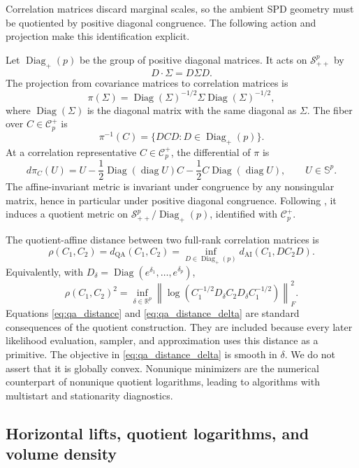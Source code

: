\documentclass[
  12pt]{article}
\newcommand{\SPD}{\mathcal S_{++}}
\newcommand{\Sym}{\mathbb S}
\newcommand{\Corr}{\mathcal C^+}
\newcommand{\Diagp}{\operatorname{Diag}_{+}}
\newcommand{\diag}{\operatorname{diag}}
\newcommand{\Diag}{\operatorname{Diag}}
\newcommand{\R}{\mathbb R}
\newcommand{\QA}{\mathrm{QA}}
\newcommand{\AI}{\mathrm{AI}}
\begin{document}
Correlation matrices discard marginal scales, so the ambient SPD geometry must be quotiented by positive diagonal congruence. The following action and projection make this identification explicit.

Let $\Diagp(p)$ be the group of positive diagonal matrices. It acts on $\SPD^p$ by
\[
D\cdot\Sigma=D\Sigma D.
\]
The projection from covariance matrices to correlation matrices is
\[
\pi(\Sigma)=\Diag(\Sigma)^{-1/2}\Sigma\Diag(\Sigma)^{-1/2},
\]
where $\Diag(\Sigma)$ is the diagonal matrix with the same diagonal as $\Sigma$. The fiber over $C\in\Corr_p$ is
\[
\pi^{-1}(C)=\{DCD:D\in\Diagp(p)\}.
\]
At a correlation representative $C\in\Corr_p$, the differential of $\pi$ is
\begin{equation}\label{eq:dpi_formula}
d\pi_C(U)=U-\frac12\Diag(\diag U)C-\frac12 C\Diag(\diag U),
\qquad U\in\Sym^p.
\end{equation}
The affine-invariant metric is invariant under congruence by any nonsingular matrix, hence in particular under positive diagonal congruence. Following \citet{david_2019_RiemannianStructureCorrelation}, it induces a quotient metric on $\SPD^p/\Diagp(p)$, identified with $\Corr_p$.



The quotient-affine distance between two full-rank correlation matrices is
\begin{equation}\label{eq:qa_distance}
\rho(C_1,C_2)=d_{\QA}(C_1,C_2)=\inf_{D\in\Diagp(p)}d_{\AI}(C_1,DC_2D).
\end{equation}
Equivalently, with $D_{\delta}=\Diag(e^{\delta_1},\ldots,e^{\delta_p})$,
\begin{equation}\label{eq:qa_distance_delta}
\rho(C_1,C_2)^2=\inf_{\delta\in\R^p}\left\|\log\left(C_1^{-1/2}D_{\delta}C_2D_{\delta}C_1^{-1/2}\right)\right\|_F^2.
\end{equation}
Equations \eqref{eq:qa_distance} and \eqref{eq:qa_distance_delta} are standard consequences of the quotient construction. They are included because every later likelihood evaluation, sampler, and approximation uses this distance as a primitive. The objective in \eqref{eq:qa_distance_delta} is smooth in $\delta$. We do not assert that it is globally convex. Nonunique minimizers are the numerical counterpart of nonunique quotient logarithms, leading to algorithms with multistart and stationarity diagnostics.


\subsection{Horizontal lifts, quotient logarithms, and volume density}
\end{document}
